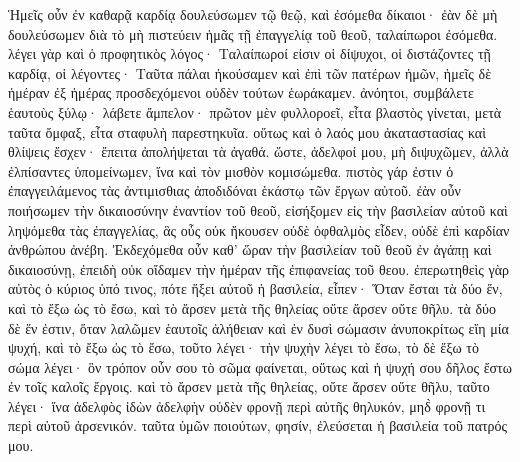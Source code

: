 Ἡμεῖς οὖν ἐν καθαρᾷ καρδίᾳ δουλεύσωμεν τῷ θεῷ, καὶ ἐσόμεθα δίκαιοι· ἐὰν δὲ μὴ δουλεύσωμεν διὰ τὸ μὴ πιστεύειν ἡμᾶς τῇ ἐπαγγελίᾳ τοῦ θεοῦ, ταλαίπωροι ἐσόμεθα. λέγει γὰρ καὶ ὁ προφητικὸς λόγος· Ταλαίπωροί εἰσιν οἱ δίψυχοι, οἱ διστάζοντες τῇ καρδίᾳ, οἱ λέγοντες· Ταῦτα πάλαι ἠκούσαμεν καὶ ἐπὶ τῶν πατέρων ἡμῶν, ἡμεῖς δὲ ἡμέραν ἐξ ἡμέρας προσδεχόμενοι οὐδὲν τούτων ἑωράκαμεν. ἀνόητοι, συμβάλετε ἑαυτοὺς ξύλῳ· λάβετε ἄμπελον· πρῶτον μὲν φυλλοροεῖ, εἶτα βλαστὸς γίνεται, μετὰ ταῦτα ὄμφαξ, εἶτα σταφυλὴ παρεστηκυῖα. οὕτως καὶ ὁ λαός μου ἀκαταστασίας καὶ θλίψεις ἔσχεν· ἔπειτα ἀπολήψεται τὰ ἀγαθά. ὥστε, ἀδελφοί μου, μὴ διψυχῶμεν, ἀλλὰ ἐλπίσαντες ὑπομείνωμεν, ἵνα καὶ τὸν μισθὸν κομισώμεθα. πιστὸς γάρ ἐστιν ὁ ἐπαγγειλάμενος τὰς ἀντιμισθιας ἀποδιδόναι ἑκάστῳ τῶν ἔργων αὐτοῦ. ἐὰν οὖν ποιήσωμεν τὴν δικαιοσύνην ἐναντίον τοῦ θεοῦ, εἰσήξομεν εἰς τὴν βασιλείαν αὐτοῦ καὶ ληψόμεθα τὰς ἐπαγγελίας, ἃς οὖς οὐκ ἤκουσεν οὐδὲ ὀφθαλμὸς εἶδεν, οὐδὲ ἐπὶ καρδίαν ἀνθρώπου ἀνέβη. 
Ἐκδεχόμεθα οὖν καθ’ ὥραν τὴν βασιλείαν τοῦ θεοῦ ἐν ἀγάπῃ καὶ δικαιοσύνῃ, ἐπειδὴ οὐκ οἴδαμεν τὴν ἡμέραν τῆς ἐπιφανείας τοῦ θεου. ἐπερωτηθεὶς γὰρ αὐτὸς ὁ κύριος ὑπό τινος, πότε ἥξει αὐτοῦ ἡ βασιλεία, εἶπεν· Ὅταν ἔσται τὰ δύο ἕν, καὶ τὸ ἔξω ὡς τὸ ἔσω, καὶ τὸ ἄρσεν μετὰ τῆς θηλείας οὔτε ἄρσεν οὔτε θῆλυ. τὰ δύο δὲ ἕν ἐστιν, ὅταν λαλῶμεν ἑαυτοῖς ἀλήθειαν καὶ ἐν δυσὶ σώμασιν ἀνυποκρίτως εἴη μία ψυχή, καὶ τὸ ἔξω ὡς τὸ ἔσω, τοῦτο λέγει· τὴν ψυχὴν λέγει τὸ ἔσω, τὸ δὲ ἔξω τὸ σώμα λέγει· ὃν τρόπον οὖν σου τὸ σῶμα φαίνεται, οὕτως καὶ ἡ ψυχή σου δῆλος ἔστω ἐν τοῖς καλοῖς ἔργοις.  καὶ τὸ ἄρσεν μετὰ τῆς θηλείας, οὔτε ἄρσεν οὔτε θῆλυ, ταῦτο λέγει· ἵνα ἀδελφὸς ἰδὼν ἀδελφὴν οὐδὲν φρονῇ περὶ αὐτῆς θηλυκόν, μηδ̀ φρονῇ τι περὶ αὐτοῦ ἀρσενικόν. ταῦτα ὑμῶν ποιούτων, φησίν, ἐλεύσεται ἡ βασιλεία τοῦ πατρός μου.
